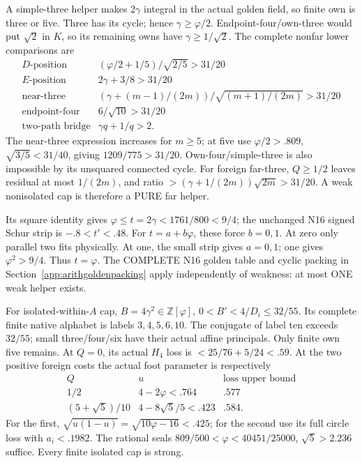 \documentclass[11pt]{article}
\begin{document}
A simple-three helper makes \(2\gamma\)
integral in the actual golden field,
so finite own is three or five.
Three has its cycle; hence
\(\gamma\ge\varphi/2\).
Endpoint-four/own-three would put
\(\sqrt2\) in \(K\), so its remaining
owns have \(\gamma\ge1/\sqrt2\).
The complete nonfar lower comparisons are
\[
 \begin{array}{c|c}
 D\text{-position}&(\varphi/2+1/5)/\sqrt{2/5}>31/20\\
 E\text{-position}&2\gamma+3/8>31/20\\
 \text{near-three}&
 (\gamma+(m-1)/(2m))/\sqrt{(m+1)/(2m)}>31/20\\
 \text{endpoint-four}&6/\sqrt{10}>31/20\\
 \text{two-path bridge}&\gamma q+1/q>2 .
 \end{array}
\]
The near-three expression increases for
\(m\ge5\); at five use \(\varphi/2>.809\),
\(\sqrt{3/5}<31/40\), giving
\(1209/775>31/20\).
Own-four/simple-three is also impossible
by its unsquared connected cycle.
For foreign far-three, \(Q\ge1/2\)
leaves residual at most \(1/(2m)\),
and ratio \(>(\gamma+1/(2m))\sqrt{2m}>31/20\).
A weak nonisolated cap is therefore
a PURE far helper.

Its square identity gives
\(\varphi\le t=2\gamma<1761/800<9/4\);
the unchanged N16 signed Schur strip is
\(-.8<t'<.48\).
For \(t=a+b\varphi\), these force
\(b=0,1\).
At zero only parallel two fits physically.
At one, the small strip gives \(a=0,1\);
one gives \(\varphi^2>9/4\).
Thus \(t=\varphi\).
The COMPLETE N16 golden table and cyclic
packing in Section~\ref{app:arithgoldenpacking}
apply independently of weakness: at most
ONE weak helper exists.

For isolated-within-\(A\) cap,
\(B=4\gamma^2\in\mathbb Z[\varphi]\),
\(0<B'<4/D_i\le32/55\).
Its complete finite native alphabet is
labels \(3,4,5,6,10\).
The conjugate of label ten exceeds
\(32/55\); small three/four/six have
their actual affine principals.
Only finite own five remains.
At \(Q=0\), its actual \(H_4\) loss is
\(<25/76+5/24<.59\).
At the two positive foreign costs the
actual foot parameter is respectively
\[
 \begin{array}{c|c|c}
 Q&u&\text{loss upper bound}\\ \hline
 1/2&4-2\varphi<.764&.577\\
 (5+\sqrt5)/10&4-8\sqrt5/5<.423&.584 .
 \end{array}
\]
For the first,
\(\sqrt{u(1-u)}=\sqrt{10\varphi-16}<.425\);
for the second use its full circle loss
with \(a_i<.1982\).
The rational seals
\(809/500<\varphi<40451/25000\),
\(\sqrt5>2.236\) suffice.
Every finite isolated cap is strong.
\end{document}
